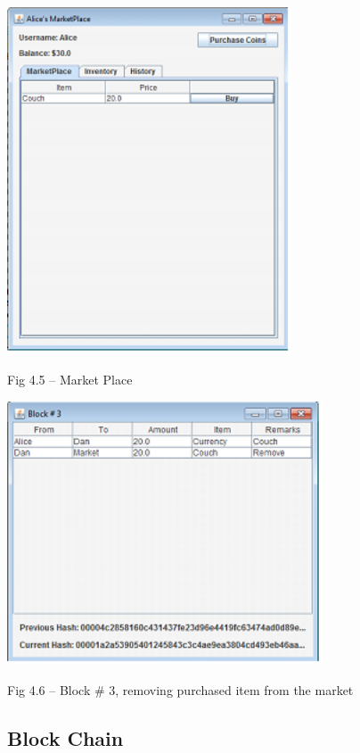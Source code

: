 \documentclass{article} %
\begin{document}
\noindent \begin{center}
\includegraphics*[bb=0 0 3.32in 4.06in, width=3.32in, height=4.06in, keepaspectratio=false]{image5.png}

\noindent Fig 4.5 -- Market Place

\noindent \includegraphics*[bb=0 0 3.70in 3.08in, width=3.70in, height=3.08in, keepaspectratio=false]{image6.png}

\noindent Fig 4.6 -- Block \# 3, removing purchased item from the market
\end{center}

\noindent \begin{flushleft}

\end{flushleft}

\noindent 
\subsection{Block Chain}
\end{document}
